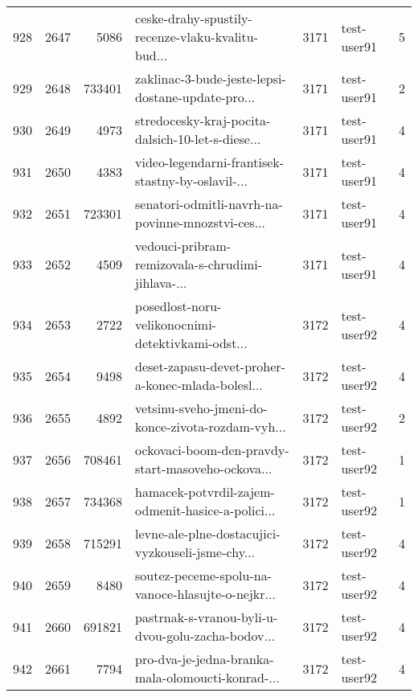 \begin{tabular}{lrrlrlr}
928  &       2647 &     5086 &  ceske-drahy-spustily-recenze-vlaku-kvalitu-bud... &     3171 &                  test-user91 &               5 \\
929  &       2648 &   733401 &  zaklinac-3-bude-jeste-lepsi-dostane-update-pro... &     3171 &                  test-user91 &               2 \\
930  &       2649 &     4973 &  stredocesky-kraj-pocita-dalsich-10-let-s-diese... &     3171 &                  test-user91 &               4 \\
931  &       2650 &     4383 &  video-legendarni-frantisek-stastny-by-oslavil-... &     3171 &                  test-user91 &               4 \\
932  &       2651 &   723301 &  senatori-odmitli-navrh-na-povinne-mnozstvi-ces... &     3171 &                  test-user91 &               4 \\
933  &       2652 &     4509 &  vedouci-pribram-remizovala-s-chrudimi-jihlava-... &     3171 &                  test-user91 &               4 \\
934  &       2653 &     2722 &  posedlost-noru-velikonocnimi-detektivkami-odst... &     3172 &                  test-user92 &               4 \\
935  &       2654 &     9498 &  deset-zapasu-devet-proher-a-konec-mlada-bolesl... &     3172 &                  test-user92 &               4 \\
936  &       2655 &     4892 &  vetsinu-sveho-jmeni-do-konce-zivota-rozdam-vyh... &     3172 &                  test-user92 &               2 \\
937  &       2656 &   708461 &  ockovaci-boom-den-pravdy-start-masoveho-ockova... &     3172 &                  test-user92 &               1 \\
938  &       2657 &   734368 &  hamacek-potvrdil-zajem-odmenit-hasice-a-polici... &     3172 &                  test-user92 &               1 \\
939  &       2658 &   715291 &  levne-ale-plne-dostacujici-vyzkouseli-jsme-chy... &     3172 &                  test-user92 &               4 \\
940  &       2659 &     8480 &  soutez-peceme-spolu-na-vanoce-hlasujte-o-nejkr... &     3172 &                  test-user92 &               4 \\
941  &       2660 &   691821 &  pastrnak-s-vranou-byli-u-dvou-golu-zacha-bodov... &     3172 &                  test-user92 &               4 \\
942  &       2661 &     7794 &  pro-dva-je-jedna-branka-mala-olomoucti-konrad-... &     3172 &                  test-user92 &               4 \\

\end{tabular}
